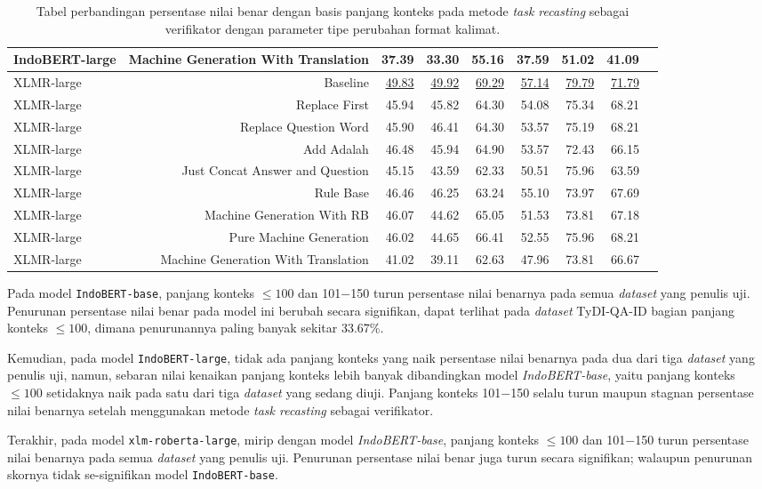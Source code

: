 \begin{table}[H]
\begin{tabular}{lrrrrrrrr}
IndoBERT-large &Machine Generation With Translation &37.39 &33.30 &55.16 &37.59 &51.02 &41.09 \\
\hline
XLMR-large &Baseline &\underline{49.83} &\underline{49.92} &\underline{69.29} &\underline{57.14} &\underline{79.79} &\underline{71.79} \\
XLMR-large &Replace First &45.94 &45.82 &64.30 &54.08 &75.34 &68.21 \\
XLMR-large &Replace Question Word &45.90 &46.41 &64.30 &53.57 &75.19 &68.21 \\
XLMR-large &Add Adalah &46.48 &45.94 &64.90 &53.57 &72.43 &66.15 \\
XLMR-large &Just Concat Answer and Question &45.15 &43.59 &62.33 &50.51 &75.96 &63.59 \\
XLMR-large &Rule Base &46.46 &46.25 &63.24 &55.10 &73.97 &67.69 \\
XLMR-large &Machine Generation With RB &46.07 &44.62 &65.05 &51.53 &73.81 &67.18 \\
XLMR-large &Pure Machine Generation &46.02 &44.65 &66.41 &52.55 &75.96 &68.21 \\
XLMR-large &Machine Generation With Translation &41.02 &39.11 &62.63 &47.96 &73.81 &66.67 \\
\bottomrule
\end{tabular}
\caption{Tabel perbandingan persentase nilai benar dengan basis panjang konteks pada metode \emph{task recasting} sebagai verifikator dengan parameter tipe perubahan format kalimat.}
\end{table}

Pada model \texttt{IndoBERT-base}, panjang konteks $\leq100$ dan 101$-$150 turun persentase nilai benarnya pada semua \emph{dataset} yang penulis uji. Penurunan persentase nilai benar pada model ini berubah secara signifikan, dapat terlihat pada \emph{dataset} TyDI-QA-ID bagian panjang konteks $\leq100$, dimana penurunannya paling banyak sekitar 33.67\%.

Kemudian, pada model \texttt{IndoBERT-large}, tidak ada panjang konteks yang naik persentase nilai benarnya pada dua dari tiga \emph{dataset} yang penulis uji, namun, sebaran nilai kenaikan panjang konteks lebih banyak dibandingkan model \emph{IndoBERT-base}, yaitu panjang konteks  $\leq100$ setidaknya naik pada satu dari tiga \emph{dataset} yang sedang diuji. Panjang konteks  101$-$150 selalu turun maupun stagnan persentase nilai benarnya setelah menggunakan metode \emph{task recasting} sebagai verifikator.

Terakhir, pada model \texttt{xlm-roberta-large}, mirip dengan model \emph{IndoBERT-base}, panjang konteks $\leq100$ dan 101$-$150 turun persentase nilai benarnya pada semua \emph{dataset} yang penulis uji. Penurunan persentase nilai benar juga turun secara signifikan; walaupun penurunan skornya tidak se-signifikan model \texttt{IndoBERT-base}.

